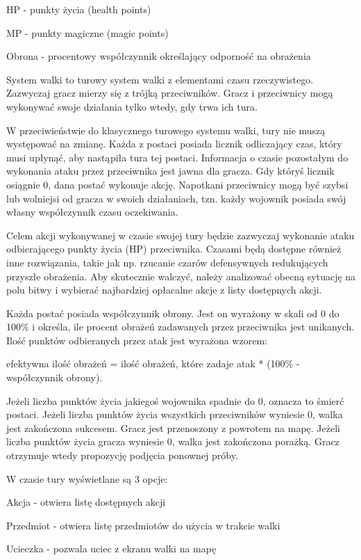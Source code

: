 HP - punkty życia (health points)

MP - punkty magiczne (magic points)

Obrona - procentowy współczynnik określający odporność na obrażenia

System walki to turowy system walki z elementami czasu rzeczywistego.
Zazwyczaj gracz mierzy się z trójką przeciwników.
Gracz i przeciwnicy mogą wykonywać swoje działania tylko wtedy, gdy trwa ich 
tura.

W przeciwieństwie do klasycznego turowego systemu walki, tury nie muszą
występować na zmianę.
Każda z postaci posiada licznik odliczający czas, który musi upłynąć, aby 
nastąpiła tura tej postaci.
Informacja o czasie pozostałym do wykonania ataku przez przeciwnika jest jawna 
dla gracza. Gdy któryś licznik osiągnie 0, dana postać wykonuje akcję.
Napotkani przeciwnicy mogą być szybsi lub wolniejsi od gracza w swoich 
działaniach, tzn. każdy wojownik posiada swój własny współczynnik czasu 
oczekiwania.

Celem akcji wykonywanej w czasie swojej tury będzie zazwyczaj wykonanie ataku 
odbierającego punkty życia (HP) przeciwnika. Czasami będą dostępne również inne 
rozwiązania, takie jak np. rzucanie czarów defensywnych redukujących przyszłe 
obrażenia. Aby skutecznie walczyć, należy analizować obecną sytuację na polu 
bitwy i wybierać najbardziej opłacalne akcje z listy dostępnych akcji.

Każda postać posiada współczynnik obrony.
Jest on wyrażony w skali od 0 do 100\% i określa, ile procent obrażeń zadawanych 
przez przeciwnika jest unikanych. Ilość punktów odbieranych przez atak jest 
wyrażona wzorem:

efektywna ilość obrażeń = ilość obrażeń, które zadaje atak * (100\% - współczynnik obrony).

Jeżeli liczba punktów życia jakiegoś wojownika spadnie do 0, oznacza to śmierć 
postaci. Jeżeli liczba punktów życia wszystkich przeciwników wyniesie 0, walka 
jest zakończona sukcesem. Gracz jest przenoszony z powrotem na mapę.
Jeżeli liczba punktów życia gracza wyniesie 0, walka jest zakończona porażką.
Gracz otrzymuje wtedy propozycję podjęcia ponownej próby.

W czasie tury wyświetlane są 3 opcje:

Akcja - otwiera listę dostępnych akcji

Przedmiot - otwiera listę przedmiotów do użycia w trakcie walki

Ucieczka - pozwala uciec z ekranu walki na mapę

